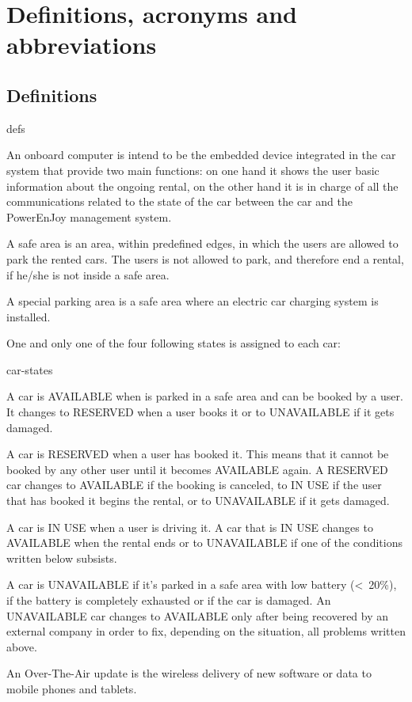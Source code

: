 \section{Definitions, acronyms and abbreviations}

\subsection{Definitions}
	\begin{labeling}{defs}
		\item[\textbf{Onboard computer}] An onboard computer is intend to be the embedded device integrated in the car system that provide two main functions: on one hand it shows the user basic information about the ongoing rental, on the other hand it is in charge of all the communications related to the state of the car between the car and the PowerEnJoy management system.
		\item[\textbf{Safe area}] A safe area is an area, within predefined edges, in which the users are allowed to park the rented cars. The users is not allowed to park, and therefore end a rental, if he/she is not inside a safe area.
		\item[\textbf{Special parking area}] A special parking area is a safe area where an electric car charging system is installed.
		\item[\textbf{Car states}] One and only one of the four following states is assigned to each car:
			\begin{labeling}{car-states}
				\item[\textbf{AVAILABLE}] A car is AVAILABLE when is parked in a safe area and can be booked by a user. It changes to RESERVED when a user books it or to UNAVAILABLE if it gets damaged.
				\item[\textbf{RESERVED}] A car is RESERVED when a user has booked it. This means that it cannot be booked by any other user until it becomes AVAILABLE again. A RESERVED car changes to AVAILABLE if the booking is canceled, to IN USE if the user that has booked it begins the rental, or to UNAVAILABLE if it gets damaged.
				\item[\textbf{IN USE}] A car is IN USE when a user is driving it. A car that is IN USE changes to AVAILABLE when the rental ends or to UNAVAILABLE if one of the conditions written below subsists.
				\item[\textbf{UNAVAILABLE}] A car is UNAVAILABLE if it's parked in a safe area with low battery (\textless\ 20\%), if the battery is completely exhausted or if the car is damaged. An UNAVAILABLE car changes to AVAILABLE only after being recovered by an external company in order to fix, depending on the situation, all problems written above.
			\end{labeling}
		\item[\textbf{Over-The-Air updates}] An Over-The-Air update is the wireless delivery of new software or data to mobile phones and tablets.
	\end{labeling}

